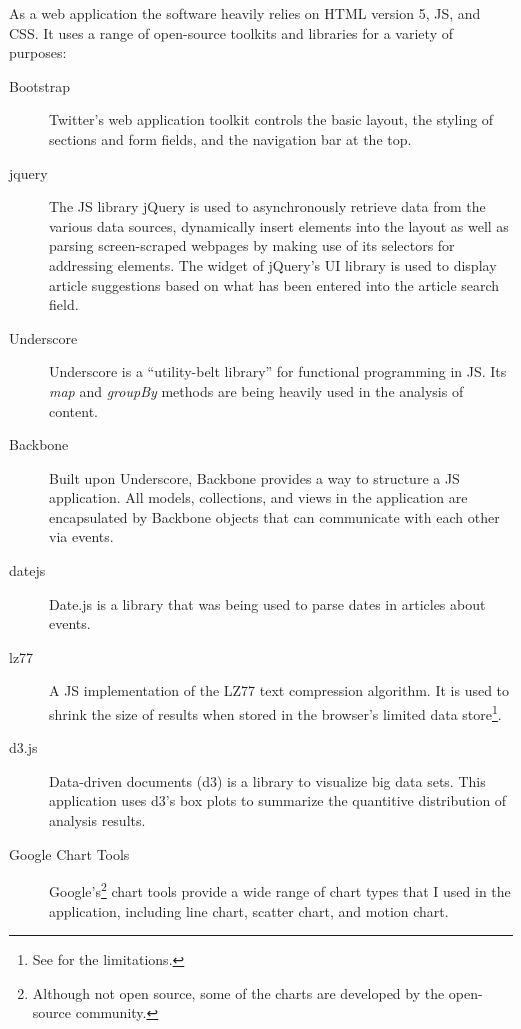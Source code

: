 As a web application the software heavily relies on \ac{HTML} version 5, \ac{JS}, and \ac{CSS}. 
It uses a range of open-source toolkits and libraries for a variety of purposes:

\begin{description}
  \item[Bootstrap] Twitter's web application toolkit controls the basic layout, the styling of sections and form fields, and the navigation bar at the top.
  \item[jquery] The \ac{JS} library jQuery is used to asynchronously retrieve data from the various data sources, dynamically insert elements into the layout as well as parsing screen-scraped webpages by making use of its selectors for addressing elements.
  The  widget of jQuery's UI library is used to display article suggestions based on what has been entered into the article search field.
  \item[Underscore] Underscore is a ``utility-belt library'' for functional programming in JS. 
  Its \emph{map} and \emph{groupBy} methods are being heavily used in the analysis of content.
  \item[Backbone] Built upon Underscore, Backbone provides a way to structure a \ac{JS} application.
  All models, collections, and views in the application are encapsulated by Backbone objects that can communicate with each other via events.
  \item[datejs] Date.js is a library that was being used to parse dates in articles about events.
  \item[lz77] A \ac{JS} implementation of the LZ77 text compression algorithm. 
  It is used to shrink the size of results when stored in the browser's limited data store\footnote{See  for the limitations.}.
  \item[d3.js] Data-driven documents (d3) is a library to visualize big data sets. 
  This application uses d3's box plots to summarize the quantitive distribution of analysis results.
  \item[Google Chart Tools] Google's\footnote{Although not open source, some of the charts are developed by the open-source community.} chart tools provide a wide range of chart types that I used in the application, including line chart, scatter chart, and motion chart.
\end{description}


